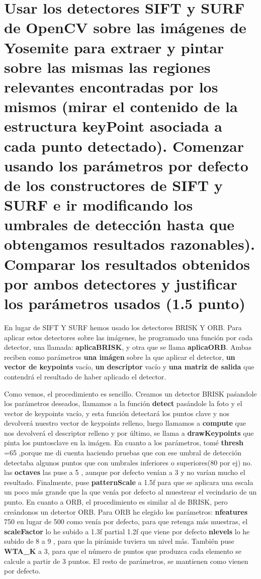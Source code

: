 \section{Usar los detectores SIFT y SURF de OpenCV sobre las imágenes de
Yosemite para extraer y pintar sobre las mismas las regiones relevantes
encontradas por los mismos (mirar el contenido de la estructura keyPoint
asociada a cada punto detectado). Comenzar usando los parámetros por
defecto de los constructores de SIFT y SURF e ir modificando los umbrales de
detección hasta que obtengamos resultados razonables). Comparar los
resultados obtenidos por ambos detectores y justificar los parámetros usados
(1.5 punto)}
En lugar de SIFT Y SURF hemos usado los detectores BRISK Y ORB. Para aplicar estos detectores sobre las
imágenes, he programado una función por cada detector, una llamada: \textbf{aplicaBRISK}, y otra que se llama
\textbf{aplicaORB}. Ambas reciben como parámetros \textbf{una imágen} sobre la que aplicar el detector,
\textbf{un vector de keypoints} vacío, \textbf{un descriptor} vacío y \textbf{una matriz de salida} que
contendrá el resultado de haber aplicado el detector.\newline

Como vemos, el procedimiento es sencillo. Creamos un detector BRISK paśandole los parámetros deseados,
llamamos a la función \textbf{detect} pasándole la foto y el vector de keypoints vacío, y esta función detectará los puntos clave
y nos devolverá nuestro vector de keypoints relleno, luego llamamos a \textbf{compute} que nos devolverá el descriptor relleno y
por último, se llama a \textbf{drawKeypoints} que pinta los puntosclave en la imágen. \newline
En cuanto a los parámetros, tomé \textbf{thresh} =65 ,porque me di cuenta haciendo pruebas que con ese umbral de detección
detectaba algunos puntos que con umbrales inferiores o superiores(80 por ej) no. las \textbf{octaves} las puse a 5 , aunque por defecto venían a 3 y no varían mucho el resultado.
Finalmente, puse \textbf{patternScale} a 1.5f para que se aplicara una escala un poco más grande que la que venía por defecto
al muestrear el vecindario de un punto. \newline
\newline
En cuanto a ORB, el procedimiento es similar al de BRISK, pero creándonos un detector ORB. Para ORB he elegido los parámetros:
\textbf{nfeatures}  750 en lugar de 500 como venía por defecto, para que retenga más muestras, el \textbf{scaleFactor} lo he subido a 1.3f partial 1.2f que viene por defecto
\textbf{nlevels} lo he subido de 8 a 9 , para que la pirámide tuviera un nivel más. También puse \textbf{WTA\_K} a 3, para
que el número de puntos que produzca cada elemento se calcule a partir de 3 puntos. El resto de parámetros, se mantienen como vienen por defecto.

